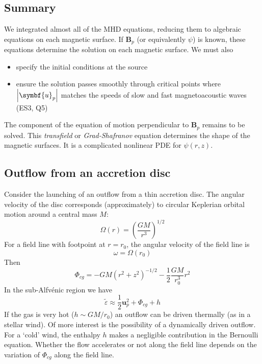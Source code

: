 \documentclass{jknotes}
\newcommand{\B}{\symbf{B}}
\renewcommand{\u}{\symbf{u}}
\newcommand{\veps}{\varepsilon}
\begin{document}
\subsection{Summary}
We integrated almost all of the MHD equations, reducing them to algebraic
equations on each magnetic surface. If $\B_p$ (or equivalently $\psi$) is
known, these equations determine the solution on each magnetic surface. We
must also
\begin{itemize}
	\item specify the initial conditions at the source
	\item ensure the solution passes smoothly through critical points where
		$\abs{\u_p}$ matches the speeds of slow and fast magnetoacoustic waves
		(ES3, Q5)
\end{itemize}

The component of the equation of motion perpendicular to $\B_p$ remains to be
solved. This \emph{transfield} or \emph{Grad-Shafranov} equation determines
the shape of the magnetic surfaces. It is a complicated nonlinear PDE for
$\psi(r,z)$.

\subsection{Outflow from an accretion disc}
Consider the launching of an outflow from a thin accretion disc. The angular
velocity of the disc corresponds (approximately) to circular Keplerian orbital
motion around a central mass $M$:
\begin{equation}
	\Omega(r) = \left(\frac{GM}{r^3}\right)^{1/2}
\end{equation}
For a field line with footpoint at $r=r_0$, the angular velocity of the field
line is
\begin{equation}
	\omega = \Omega(r_0)
\end{equation}
Then
\begin{equation}
	\Phi_{cg} = -GM(r^2+z^2)^{-1/2} - \frac{1}{2}\frac{GM}{r_0^3}r^2
\end{equation}
In the sub-Alfv\'{e}nic region we have
\begin{equation}
\tilde{\veps} \approx \frac{1}{2}\u_p^2 + \Phi_{cg} + h
\end{equation}
If the gas is very hot ($h \sim GM/r_0$) an outflow can be driven thermally
(as in a stellar wind). Of more interest is the possibility of a dynamically
driven outflow. For a `cold' wind, the enthalpy $h$ makes a negligible
contribution in the Bernoulli equation. Whether the flow accelerates or not
along the field line depends on the variation of $\Phi_{cg}$ along the field
line. 
\end{document}
